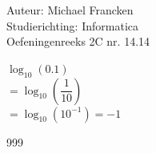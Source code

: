 \documentclass[a4paper]{article}
\begin{document}
\noindent \large Auteur: Michael Francken \\
\noindent \large Studierichting: Informatica\\
\noindent \large Oefeningenreeks 2C nr. 14.14 \\

\medskip

\normalsize

$\log_{10}(0.1)$\\

$=\log_{10}\left(\dfrac{1}{10}\right)$\\

$=\log_{10}\left(10^{-1}\right)=-1$\\


\begin{thebibliography}{999}
\end{thebibliography}
\end{document}
